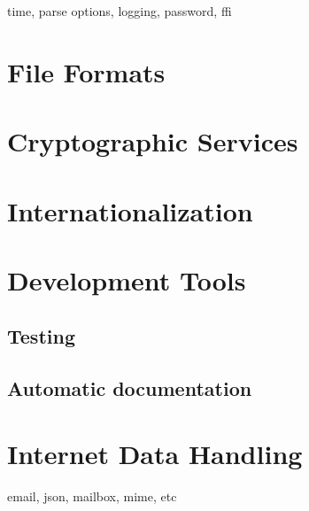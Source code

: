 \documentclass[10pt,english]{book}
\begin{document}
time, parse options, logging, password, ffi

\chapter{File Formats}

\chapter{Cryptographic Services}

\chapter{Internationalization}

\chapter{Development Tools}

\section{Testing}

\section{Automatic documentation}

\chapter{Internet Data Handling}

email, json, mailbox, mime, etc

\printindex
\end{document}
